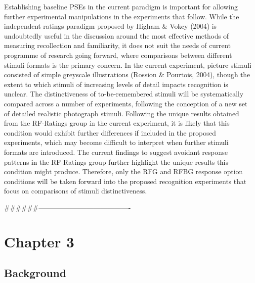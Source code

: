 \documentclass[
  11pt,
]{article}
\begin{document}
Establishing baseline PSEs in the current paradigm is important for
allowing further experimental manipulations in the experiments that
follow. While the independent ratings paradigm proposed by Higham \&
Vokey (2004) is undoubtedly useful in the discussion around the most
effective methods of measuring recollection and familiarity, it does not
suit the needs of current programme of research going forward, where
comparisons between different stimuli formats is the primary concern. In
the current experiment, picture stimuli consisted of simple greyscale
illustrations (Rossion \& Pourtois, 2004), though the extent to which
stimuli of increasing levels of detail impacts recognition is unclear.
The distinctiveness of to-be-remembered stimuli will be systematically
compared across a number of experiments, following the conception of a
new set of detailed realistic photograph stimuli. Following the unique
results obtained from the RF-Ratings group in the current experiment, it
is likely that this condition would exhibit further differences if
included in the proposed experiments, which may become difficult to
interpret when further stimuli formats are introduced. The current
findings to suggest avoidant response patterns in the RF-Ratings group
further highlight the unique results this condition might produce.
Therefore, only the RFG and RFBG response option conditions will be
taken forward into the proposed recognition experiments that focus on
comparisons of stimuli distinctiveness.

\#\#\#\#\#\#----------------------------------------

\newpage

\hypertarget{chapter-3}{%
\section{Chapter 3}\label{chapter-3}}

\hypertarget{background-1}{%
\subsection{Background}\label{background-1}}
\end{document}
